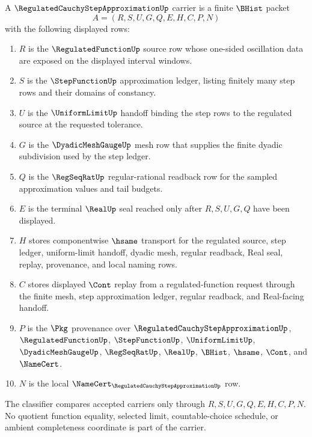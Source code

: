\begin{definition}
\label{def:regulated-cauchy-step-approximation-carrier}
A $\RegulatedCauchyStepApproximationUp$ carrier is a finite $\BHist$ packet
$$
A=(R,S,U,G,Q,E,H,C,P,N)
$$
with the following displayed rows:
\begin{enumerate}
\item $R$ is the $\RegulatedFunctionUp$ source row whose one-sided oscillation data are exposed on the displayed interval windows.
\item $S$ is the $\StepFunctionUp$ approximation ledger, listing finitely many step rows and their domains of constancy.
\item $U$ is the $\UniformLimitUp$ handoff binding the step rows to the regulated source at the requested tolerance.
\item $G$ is the $\DyadicMeshGaugeUp$ mesh row that supplies the finite dyadic subdivision used by the step ledger.
\item $Q$ is the $\RegSeqRatUp$ regular-rational readback row for the sampled approximation values and tail budgets.
\item $E$ is the terminal $\RealUp$ seal reached only after $R,S,U,G,Q$ have been displayed.
\item $H$ stores componentwise $\hsame$ transport for the regulated source, step ledger, uniform-limit handoff, dyadic mesh, regular readback, Real seal, replay, provenance, and local naming rows.
\item $C$ stores displayed $\Cont$ replay from a regulated-function request through the finite mesh, step approximation ledger, regular readback, and Real-facing handoff.
\item $P$ is the $\Pkg$ provenance over $\RegulatedCauchyStepApproximationUp$, $\RegulatedFunctionUp$, $\StepFunctionUp$, $\UniformLimitUp$, $\DyadicMeshGaugeUp$, $\RegSeqRatUp$, $\RealUp$, $\BHist$, $\hsame$, $\Cont$, and $\NameCert$.
\item $N$ is the local $\NameCert_{\RegulatedCauchyStepApproximationUp}$ row.
\end{enumerate}
The classifier compares accepted carriers only through $R,S,U,G,Q,E,H,C,P,N$. No quotient function equality, selected limit, countable-choice schedule, or ambient completeness coordinate is part of the carrier.
\end{definition}

